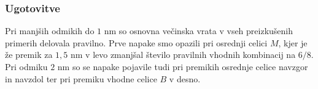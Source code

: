 \documentclass[12pt,a4paper]{article}
\begin{document}
\begin{table}[H]
    \centering

    \caption{Pravilnost delovanja in absolutna izhodna polarizacija pri odmikih osrednje celice $M$.}
    \label{g18:tab:osnovna-m}
\end{table}

\subsubsection{Ugotovitve}
\label{g18:sec:rez-osnovna-ugotovitve}

Pri manjših odmikih do $1$ nm so osnovna večinska vrata v vseh preizkušenih primerih delovala pravilno.
Prve napake smo opazili pri osrednji celici $M$, kjer je že premik za $1{,}5$ nm v levo zmanjšal število
pravilnih vhodnih kombinacij na $6/8$. Pri odmiku $2$ nm so se napake pojavile tudi pri
premikih osrednje celice navzgor in navzdol ter pri premiku vhodne celice $B$ v desno.
\end{document}
